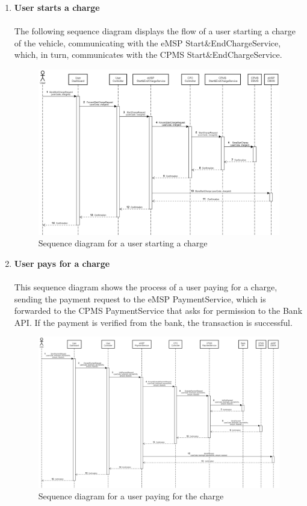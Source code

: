 \documentclass[12pt]{report}
\begin{document}
\begin{enumerate}[1.]
    \newpage
    \item\textbf{User starts a charge}\\
    \\
    The following sequence diagram displays the flow of a user starting a charge of the vehicle, communicating with the eMSP Start\&EndChargeService, which, in turn, communicates with the CPMS Start\&EndChargeService.
    \\
    \begin{figure}[ht]
    \centering
    \includegraphics[width=\textwidth]{assets/sequencediagramCharge.png}
    \caption{Sequence diagram for a user starting a charge}
    \label{fig:my_label343453666}
    \end{figure}

\newpage

    \item\textbf{User pays for a charge}\\
    \\
    This sequence diagram shows the process of a user paying for a charge, sending the payment request to the eMSP PaymentService, which is forwarded to the CPMS PaymentService that asks for permission to the Bank API. If the payment is verified from the bank, the transaction is successful.
   \\
    \begin{figure}[ht]
    \centering
    \includegraphics[width=1.1\textwidth]{assets/sequenceDiagramPayment.png}
    \caption{Sequence diagram for a user paying for the charge}
    \label{fig:my_label34534534}
    \end{figure}
 


\end{enumerate}
\end{document}
